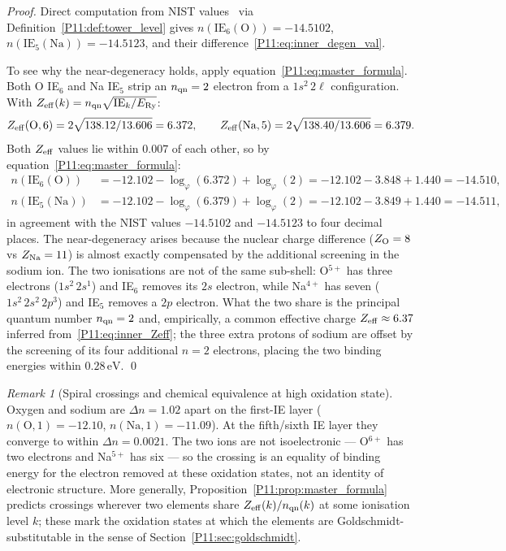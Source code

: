 \documentclass[11pt,a4paper]{article}
\theoremstyle{definition}
\theoremstyle{remark}
\newtheorem{remark}[theorem]{Remark}
\newcommand{\vp}{\varphi}
\newcommand{\ERy}{E_{\mathrm{Ry}}}
\newcommand{\nlvl}[1]{n\!\left(#1\right)}
\newcommand{\IE}{\mathrm{IE}}
\begin{document}
\begin{proof}
Direct computation from NIST values~\cite{NIST_ASD}
via Definition~\ref{P11:def:tower_level} gives
$\nlvl{\IE_6(\mathrm{O})}=-14.5102$,
$\nlvl{\IE_5(\mathrm{Na})}=-14.5123$,
and their difference~\eqref{P11:eq:inner_degen_val}.

To see why the near-degeneracy holds, apply
equation~\eqref{P11:eq:master_formula}.
Both O IE$_6$ and Na IE$_5$ strip an $n_{\rm qn}=2$ electron
from a $1s^2\,2\ell$ configuration.
With $Z_{\rm eff}(k) = n_{\rm qn}\sqrt{\IE_k/\ERy}$:
\begin{equation}
  Z_{\rm eff}(\mathrm{O},6)  = 2\sqrt{138.12/13.606} = 6.372,
  \qquad
  Z_{\rm eff}(\mathrm{Na},5) = 2\sqrt{138.40/13.606} = 6.379.
  \label{P11:eq:inner_Zeff}
\end{equation}
Both $Z_{\rm eff}$ values lie within $0.007$ of each other, so
by equation~\eqref{P11:eq:master_formula}:
\begin{align}
  \nlvl{\IE_6(\mathrm{O})}
  &= -12.102 - \log_\vp(6.372) + \log_\vp(2)
   = -12.102 - 3.848 + 1.440 = -14.510,
  \label{P11:eq:inner_proof_O}\\
  \nlvl{\IE_5(\mathrm{Na})}
  &= -12.102 - \log_\vp(6.379) + \log_\vp(2)
   = -12.102 - 3.849 + 1.440 = -14.511,
  \label{P11:eq:inner_proof_Na}
\end{align}
in agreement with the NIST values $-14.5102$ and $-14.5123$ to four
decimal places.
The near-degeneracy arises because the nuclear charge difference
($Z_{\rm O}=8$ vs $Z_{\rm Na}=11$) is almost exactly compensated by
the additional screening in the sodium ion.  The two ionisations are
not of the same sub-shell: O$^{5+}$ has three electrons
($1s^2\,2s^1$) and IE$_6$ removes its $2s$ electron, while
Na$^{4+}$ has seven ($1s^2\,2s^2\,2p^3$) and IE$_5$ removes a $2p$
electron.  What the two share is the principal quantum number
$n_{\rm qn}=2$ and, empirically, a common effective charge
$Z_{\rm eff}\approx6.37$ inferred
from~\eqref{P11:eq:inner_Zeff}; the three extra protons of sodium
are offset by the screening of its four additional $n=2$ electrons,
placing the two binding energies within $0.28\,\mathrm{eV}$.
\qed
\end{proof}

\begin{remark}[Spiral crossings and chemical equivalence at high oxidation state]
\label{P11:rem:spiral_crossing}
Oxygen and sodium are $\Delta n=1.02$ apart on the first-IE layer
($n(\mathrm{O,1})=-12.10$, $n(\mathrm{Na,1})=-11.09$).
At the fifth/sixth IE layer they converge to within $\Delta n=0.0021$.
The two ions are not isoelectronic --- O$^{6+}$ has two electrons
and Na$^{5+}$ has six --- so the crossing is an equality of binding
energy for the electron removed at these oxidation states, not an
identity of electronic structure.
More generally, Proposition~\ref{P11:prop:master_formula} predicts
crossings wherever two elements share $Z_{\rm eff}(k)/n_{\rm qn}(k)$
at some ionisation level $k$; these mark the oxidation states at
which the elements are Goldschmidt-substitutable in the sense of
Section~\ref{P11:sec:goldschmidt}.
\end{remark}
\end{document}
